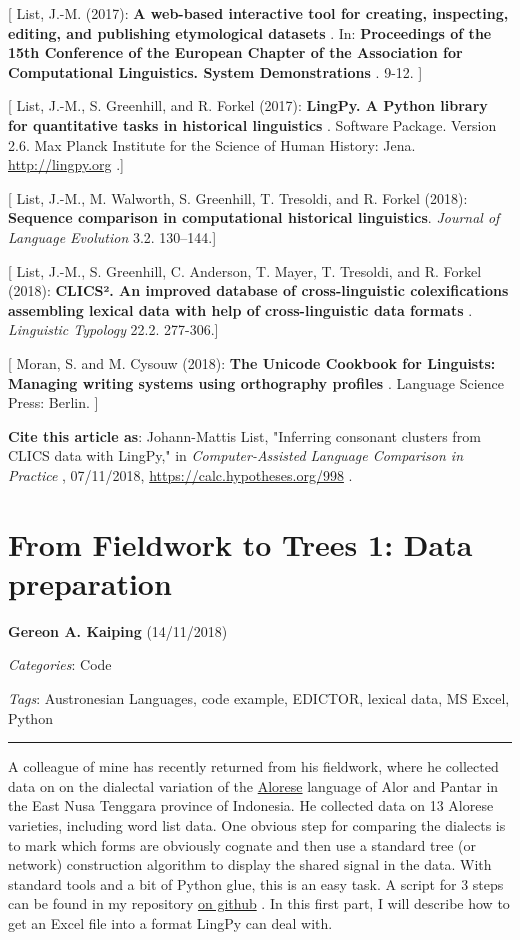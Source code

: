 \documentclass[
  english,
  a4paper,
  oneside,tablecaptionabove
]{scrbook}
\begin{document}
{[} List, J.-M. (2017): \textbf{A web-based interactive tool for
creating, inspecting, editing, and publishing etymological datasets} .
In: \textbf{Proceedings of the 15th Conference of the European Chapter
of the Association for Computational Linguistics. System Demonstrations}
. 9-12. {]}

{[} List, J.-M., S. Greenhill, and R. Forkel (2017): \textbf{LingPy. A
Python library for quantitative tasks in historical linguistics} .
Software Package. Version 2.6. Max Planck Institute for the Science of
Human History: Jena. \href{//lingpy.org”}{http://lingpy.org} .{]}

{[} List, J.-M., M. Walworth, S. Greenhill, T. Tresoldi, and R. Forkel
(2018): \textbf{Sequence comparison in computational historical
linguistics}. \emph{Journal of Language Evolution} 3.2. 130--144.{]}

{[} List, J.-M., S. Greenhill, C. Anderson, T. Mayer, T. Tresoldi, and
R. Forkel (2018): \textbf{CLICS². An improved database of
cross-linguistic colexifications assembling lexical data with help of
cross-linguistic data formats} . \emph{Linguistic Typology} 22.2.
277-306.{]}

{[} Moran, S. and M. Cysouw (2018): \textbf{The Unicode Cookbook for
Linguists: Managing writing systems using orthography profiles} .
Language Science Press: Berlin. {]}

\textbf{Cite this article as}: Johann-Mattis List, "Inferring consonant
clusters from CLICS data with LingPy," in \emph{Computer-Assisted
Language Comparison in Practice} , 07/11/2018,
\url{https://calc.hypotheses.org/998} .

\hypertarget{from-fieldwork-to-trees-1-data-preparation}{%
\chapter{From Fieldwork to Trees 1: Data
preparation}\label{from-fieldwork-to-trees-1-data-preparation}}

\textbf{Gereon A. Kaiping} (14/11/2018)

\emph{Categories}: Code

\emph{Tags}: Austronesian Languages, code example, EDICTOR, lexical
data, MS Excel, Python

\begin{center}\rule{0.5\linewidth}{\linethickness}\end{center}

A colleague of mine has recently returned from his fieldwork, where he
collected data on on the dialectal variation of the
\href{https://glottolog.org/resource/languoid/id/alor1247}{Alorese}
language of Alor and Pantar in the East Nusa Tenggara province of
Indonesia. He collected data on 13 Alorese varieties, including word
list data. One obvious step for comparing the dialects is to mark which
forms are obviously cognate and then use a standard tree (or network)
construction algorithm to display the shared signal in the data. With
standard tools and a bit of Python glue, this is an easy task. A script
for 3 steps can be found in my repository
\href{https://github.com/Anaphory/matrix_to_beastling/tree/master}{on
github} . In this first part, I will describe how to get an Excel file
into a format LingPy can deal with.
\end{document}
